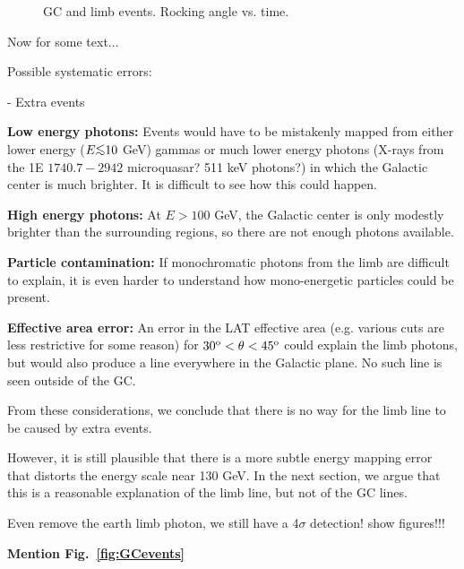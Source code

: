 \documentclass[aps,twocolumn,prd,superscriptaddress,showpacs,nofootinbib,fixfloat]{revtex4}
\newcommand{\degree}{^{\rm o}}
\def\la{\vcenter{\hbox{$<$}\offinterlineskip\hbox{$\sim$}}}
\begin{document}
\begin{figure}[p]
  \begin{center}
  \end{center}
  \caption{GC and limb events. Rocking angle vs. time.}
  \label{fig:rockTime}
\end{figure}

Now for some text...

Possible systematic errors:

- Extra events

{\bf Low energy photons:} Events would have to be mistakenly mapped from
either lower energy ($E \la 10$ GeV) gammas or much lower energy photons
(X-rays from the 1E $1740.7-2942$ microquasar?  511 keV photons?) in which the
Galactic center is much brighter.  It is difficult to see how this could
happen.

{\bf High energy photons:} At $E > 100$ GeV, the Galactic center is only
modestly brighter than the surrounding regions, so there are not enough
photons available.

{\bf Particle contamination:} If monochromatic photons from the limb are
difficult to explain, it is even harder to understand how mono-energetic
particles could be present. 

{\bf Effective area error:} An error in the LAT effective area (e.g. various
cuts are less restrictive for some reason) for $30\degree < \theta <
45\degree$ could explain the limb photons, but would also produce a line
everywhere in the Galactic plane.  No such line is seen outside of the GC. 

From these considerations, we conclude that there is no way for the limb line
to be caused by extra events. 

However, it is still plausible that there is a more subtle energy mapping
error that distorts the energy scale near 130 GeV.  In the next section, we
argue that this is a reasonable explanation of the limb line, but not of the
GC lines. 


Even remove the earth limb photon, we still have a 4$\sigma$ detection! show figures!!!

\textbf{Mention Fig.~\ref{fig:GCevents}}
\end{document}

